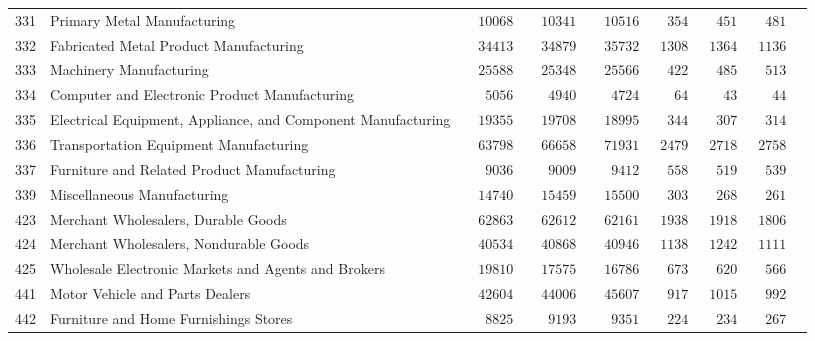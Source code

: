 \documentclass[9pt, oneside]{article}   	%
\begin{document}
\begin{longtable}{lp{3 in}ccccccc}
331  & Primary Metal Manufacturing & $\phantom{00}10068$ & $\phantom{00}10341$ & $\phantom{00}10516$ & $\phantom{00}354$ & $\phantom{00}451$ & $\phantom{00}481$ \\
332  & Fabricated Metal Product Manufacturing & $\phantom{00}34413$ & $\phantom{00}34879$ & $\phantom{00}35732$ & $\phantom{0}1308$ & $\phantom{0}1364$ & $\phantom{0}1136$ \\
333  & Machinery Manufacturing & $\phantom{00}25588$ & $\phantom{00}25348$ & $\phantom{00}25566$ & $\phantom{00}422$ & $\phantom{00}485$ & $\phantom{00}513$ \\
334  & Computer and Electronic Product Manufacturing & $\phantom{000}5056$ & $\phantom{000}4940$ & $\phantom{000}4724$ & $\phantom{000}64$ & $\phantom{000}43$ & $\phantom{000}44$ \\
335  & Electrical Equipment, Appliance, and Component Manufacturing & $\phantom{00}19355$ & $\phantom{00}19708$ & $\phantom{00}18995$ & $\phantom{00}344$ & $\phantom{00}307$ & $\phantom{00}314$ \\
336  & Transportation Equipment Manufacturing & $\phantom{00}63798$ & $\phantom{00}66658$ & $\phantom{00}71931$ & $\phantom{0}2479$ & $\phantom{0}2718$ & $\phantom{0}2758$ \\
337  & Furniture and Related Product Manufacturing & $\phantom{000}9036$ & $\phantom{000}9009$ & $\phantom{000}9412$ & $\phantom{00}558$ & $\phantom{00}519$ & $\phantom{00}539$ \\
339  & Miscellaneous Manufacturing & $\phantom{00}14740$ & $\phantom{00}15459$ & $\phantom{00}15500$ & $\phantom{00}303$ & $\phantom{00}268$ & $\phantom{00}261$ \\
423  & Merchant Wholesalers, Durable Goods & $\phantom{00}62863$ & $\phantom{00}62612$ & $\phantom{00}62161$ & $\phantom{0}1938$ & $\phantom{0}1918$ & $\phantom{0}1806$ \\
424  & Merchant Wholesalers, Nondurable Goods & $\phantom{00}40534$ & $\phantom{00}40868$ & $\phantom{00}40946$ & $\phantom{0}1138$ & $\phantom{0}1242$ & $\phantom{0}1111$ \\
425  & Wholesale Electronic Markets and Agents and Brokers & $\phantom{00}19810$ & $\phantom{00}17575$ & $\phantom{00}16786$ & $\phantom{00}673$ & $\phantom{00}620$ & $\phantom{00}566$ \\
441  & Motor Vehicle and Parts Dealers & $\phantom{00}42604$ & $\phantom{00}44006$ & $\phantom{00}45607$ & $\phantom{00}917$ & $\phantom{0}1015$ & $\phantom{00}992$ \\
442  & Furniture and Home Furnishings Stores & $\phantom{000}8825$ & $\phantom{000}9193$ & $\phantom{000}9351$ & $\phantom{00}224$ & $\phantom{00}234$ & $\phantom{00}267$ \\

\end{longtable}
\end{document}
